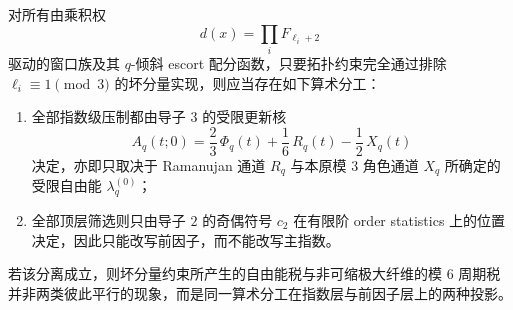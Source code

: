 \begin{conjecture}\label{conj:conclusion-conductor3-exponent-conductor2-prefactor-separation}
对所有由乘积权
\[
d(x)=\prod_i F_{\ell_i+2}
\]
驱动的窗口族及其 \(q\)-倾斜 escort 配分函数，只要拓扑约束完全通过排除 \(\ell_i\equiv 1\pmod 3\) 的坏分量实现，则应当存在如下算术分工：
\begin{enumerate}
  \item 全部指数级压制都由导子 \(3\) 的受限更新核
  \[
  A_q(t;0)
  =
  \frac23\,\Phi_q(t)+\frac16\,R_q(t)-\frac12\,X_q(t)
  \]
  决定，亦即只取决于 Ramanujan 通道 \(R_q\) 与本原模 \(3\) 角色通道 \(X_q\) 所确定的受限自由能 \(\lambda_q^{(0)}\)；
  \item 全部顶层筛选则只由导子 \(2\) 的奇偶符号 \(c_2\) 在有限阶 order statistics 上的位置决定，因此只能改写前因子，而不能改写主指数。
\end{enumerate}
若该分离成立，则坏分量约束所产生的自由能税与非可缩极大纤维的模 \(6\) 周期税并非两类彼此平行的现象，而是同一算术分工在指数层与前因子层上的两种投影。
\end{conjecture}
